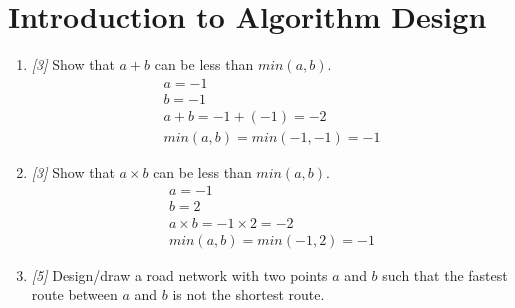 \documentclass[10pt, letterpaper]{article}
\numberwithin{equation}{section}
\begin{document}
    \section{Introduction to Algorithm Design}

    \begin{enumerate}
        \subsection*{Finding Counterexamples}

        \item \textit{[3]} Show that $a + b$ can be less than $min(a, b)$.
        \begin{gather*}
            a = -1 \\
            b = -1 \\
            a + b = -1 + (-1) = -2 \\
            min(a, b) = min(-1, -1) = -1
        \end{gather*}

        \item \textit{[3]} Show that $a \times b$ can be less than $min(a, b)$.
        \begin{gather*}
            a = -1 \\
            b = 2 \\
            a \times b = -1 \times 2 = -2 \\
            min(a, b) = min(-1, 2) = -1
        \end{gather*}

        \item \textit{[5]} Design/draw a road network with two points $a$ and $b$ such that the
        fastest route between $a$ and $b$ is not the shortest route.


\end{enumerate}
\end{document}
